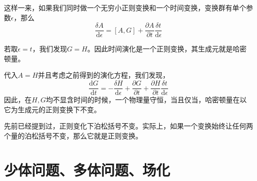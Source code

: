 \documentclass[UTF8, a4paper]{ctexart}
\begin{document}
这样一来，如果我们同时做一个无穷小正则变换和一个时间变换，变换群有单个参数$\epsilon$，那么
\begin{equation}
    \frac{\delta A}{\mathrm{d} \epsilon} = [A, G] + \frac{\partial A}{\partial t} \frac{\delta t}{\mathrm{d} \epsilon}
    \label{eq:variation-under-infinite-canonical-transformation}
\end{equation}

若取$\epsilon = t$，我们发现$G=H$。因此时间演化是一个正则变换，其生成元就是哈密顿量。

代入$A=H$并且考虑之前得到的演化方程，我们发现，
\begin{equation}
    \frac{\mathrm{d}G}{\mathrm{d}t} = - \frac{\delta H}{\mathrm{d} \epsilon} + \frac{\partial G}{\partial t} + \frac{\partial H}{\partial t} \frac{\delta t}{\mathrm{d} \epsilon}
\end{equation}
因此，在$H,G$均不显含时间的时候，一个物理量守恒，当且仅当，哈密顿量在以它为生成元的正则变换下不变。

先前已经提到过，正则变化下泊松括号不变。实际上，如果一个变换始终让任何两个量的泊松括号不变，那么它就是正则变换。

\section{少体问题、多体问题、场化}
\end{document}
